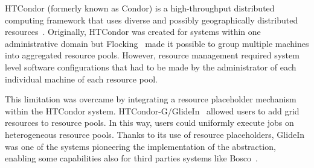 \documentclass{sig-alternate}
\begin{document}


HTCondor (formerly known as Condor) is a high-throughput distributed computing
framework that uses diverse and possibly geographically distributed
resources~\cite{thain2005}. Originally, HTCondor was created for systems within
one administrative domain but Flocking~\cite{epema1996worldwide} made it
possible to group multiple machines into aggregated resource pools. However,
resource management required system level software configurations that had to be
made by the administrator of each individual machine of each resource pool.


This limitation was overcame by integrating a resource placeholder mechanism
within the HTCondor system. HT\-Con\-dor-G/Gli\-de\-In~\cite{frey2002condorG}
allowed users to add grid resources to resource pools. In this way, users could
uniformly execute jobs on heterogeneous resource pools. Thanks to its use of
resource placeholders, GlideIn was one of the systems pioneering the
implementation of the \pilot abstraction, enabling some \pilot capabilities also
for third parties systems like Bosco~\cite{weitzel2012campus}.

\end{document}

